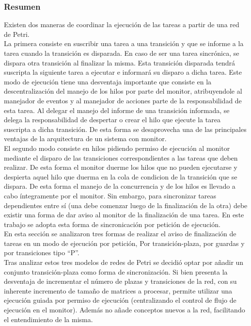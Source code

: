 \subsubsection{Resumen}
\label{sec:resumen_sincronizacion}
Existen dos maneras de coordinar la ejecución de las tareas a partir de una red
de Petri.\\ 
La primera consiste en suscribir una tarea a una transición y que se
informe a la tarea cuando la transición es disparada. En caso de ser
una tarea sincrónica, se dispara otra transición al finalizar la misma. Esta
transición disparada tendrá suscripta la siguiente tarea a ejecutar e informará
su disparo a dicha tarea. Este modo de ejecución tiene una desventaja
importante que consiste en la descentralización del manejo de los hilos por
parte del monitor, atribuyendole al manejador de eventos y al manejador de
acciones parte de la responsabilidad de esta tarea. Al delegar el manejo del
informe de una transición informada, se delega la responsabilidad de
despertar o crear el hilo que ejecute la tarea suscripta a dicha transición. De
esta forma se desaprovecha una de las principales ventajas de la arquitectura
de un sistema con monitor.\\
El segundo modo consiste en hilos pidiendo permiso de ejecución al monitor
mediante el disparo de las transiciones correspondientes a las tareas que deben
realizar. De esta forma el monitor duerme los hilos que no pueden ejecutarse y
despierta aquel hilo que duerma en la cola de condicion de la
transición que se dispara. De esta forma el manejo de la concurrencia y de los
hilos es llevado a cabo íntegramente por el monitor. Sin embargo, para
sincronizar tareas dependientes entre sí (una debe comenzar luego de la
finalización de la otra) debe existir una forma de dar aviso al monitor de la
finalización de una tarea. En este trabajo se adopta esta forma de
sincronicación por petición de ejecución.\\
En esta sección se analizaron tres formas de realizar el aviso de finalización
de tareas en un modo de ejecución por petición, Por transición-plaza, por
guardas y por transiciones tipo ``P''.\\
 Tras analizar estos tres modelos de redes de Petri se decidió optar por añadir
 un conjunto transición-plaza como forma de sincronización. Si bien presenta la
 desventaja de incrementar el número de plazas y transiciones de la red, con su
 inherente incremento de tamaño de matrices a procesar, permite utilizar una
 ejecución guiada por permiso de ejecución (centralizando el control de flujo
 de ejecución en el monitor). Además no añade conceptos nuevos a la red,
 facilitando el entendimiento de la misma.
 
 
 
 
 
